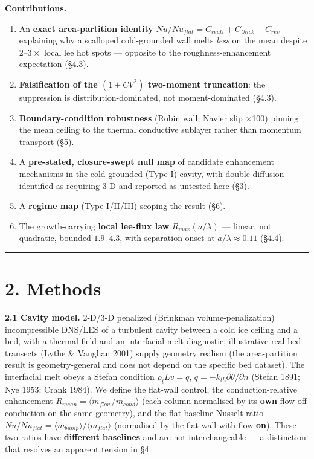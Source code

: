\documentclass[11pt]{article}
\begin{document}
\textbf{Contributions.}

\begin{enumerate}
\item An \textbf{exact area-partition identity} $Nu/Nu_{flat} = C_{reatt} + C_{thick} + C_{rev}$ explaining why a scalloped cold-grounded wall melts \emph{less} on the mean despite $2–3\times $ local lee hot spots — opposite to the roughness-enhancement expectation (§4.3).
\item \textbf{Falsification of the $(1+CV^{2})$ two-moment truncation}: the suppression is distribution-dominated, not moment-dominated (§4.3).
\item \textbf{Boundary-condition robustness} (Robin wall; Navier slip \ensuremath{\times}100) pinning the mean ceiling to the thermal conductive sublayer rather than momentum transport (§5).
\item A \textbf{pre-stated, closure-swept null map} of candidate enhancement mechanisms in the cold-grounded (Type-I) cavity, with double diffusion identified as requiring 3-D and reported as untested here (§3).
\item A \textbf{regime map} (Type I/II/III) scoping the result (§6).
\item The growth-carrying \textbf{local lee-flux law} $R_{max}(a/\lambda )$ — linear, not quadratic, bounded $1.9–4.3$, with separation onset at $a/\lambda \approx 0.11$ (§4.4).
\end{enumerate}


\medskip\hrule\medskip


\section*{2. Methods}


\textbf{2.1 Cavity model.} 2-D/3-D penalized (Brinkman volume-penalization) incompressible DNS/LES of a turbulent cavity between a cold ice ceiling and a bed, with a thermal field and an interfacial melt diagnostic; illustrative real bed transects (Lythe \& Vaughan 2001) supply geometry realism (the area-partition result is geometry-general and does not depend on the specific bed dataset). The interfacial melt obeys a Stefan condition $\rho _{i} L v = q$, $q = -k_{th} \partial \theta /\partial n$ (Stefan 1891; Nye 1953; Crank 1984). We define the flat-wall control, the conduction-relative enhancement $R_{mean} = \langle m_{flow}/m_{cond}\rangle $ (each column normalised by its \textbf{own} flow-off conduction on the same geometry), and the flat-baseline Nusselt ratio $Nu/Nu_{flat} = \langle m_{bump}\rangle /\langle m_{flat}\rangle $ (normalised by the flat wall with flow \textbf{on}). These two ratios have \textbf{different baselines} and are not interchangeable — a distinction that resolves an apparent tension in §4.
\end{document}
